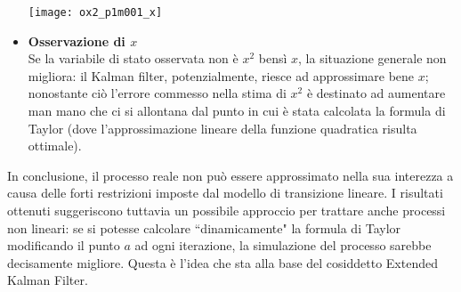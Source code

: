 \begin{itemize}
\begin{minipage}{\linewidth}
	\centering
	\texttt{[image: ox2\_p1m001\_x]}
	\label{ws_a0m100_long}
\end{minipage}

\item \textbf{Osservazione di $x$}\\
Se la variabile di stato osservata non è $x^2$ bensì $x$, la situazione generale non migliora: il Kalman filter, potenzialmente, riesce ad approssimare bene $x$; nonostante ciò l'errore commesso nella stima di $x^2$ è destinato ad aumentare man mano che ci si allontana dal punto in cui è stata calcolata la formula di Taylor (dove l'approssimazione lineare della funzione quadratica risulta ottimale). 
\end{itemize}

In conclusione, il processo reale non può essere approssimato nella sua interezza a causa delle forti restrizioni imposte dal modello di transizione lineare. I risultati ottenuti suggeriscono tuttavia un possibile approccio per trattare anche processi non lineari: se si potesse calcolare ``dinamicamente" la formula di Taylor modificando il punto $a$ ad ogni iterazione, la simulazione del processo sarebbe decisamente migliore. Questa è l'idea che sta alla base del cosiddetto Extended Kalman Filter.











